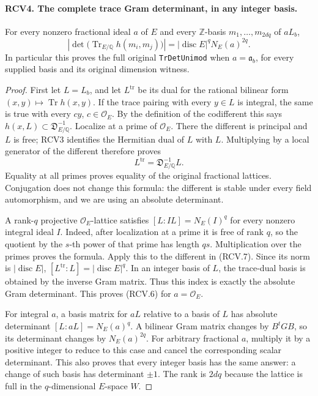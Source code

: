 \paragraph{RCV4. The complete trace Gram determinant, in any integer basis.}
\label{claim:RCV4}
For every nonzero fractional ideal \(a\) of \(E\) and every
\(\mathbb Z\)-basis \(m_1,\ldots,m_{2dq}\) of \(aL_b\),
\[
 \left|\det\big(\operatorname{Tr}_{E/\mathbb Q}
                         h(m_i,m_j)\big)\right|
       =|\operatorname{disc}E|^q N_E(a)^{2q}.
\tag{RCV.6}
\]
In particular this proves the full original \texttt{TrDetUnimod}
when \(a=\mathfrak a_b\), for every supplied basis and its original
dimension witness.
\begin{proof}
First let \(L=L_b\), and let \(L^{\mathrm{tr}}\) be its dual for
the rational bilinear form \((x,y)\mapsto\operatorname{Tr}h(x,y)\).
If the trace pairing with every \(y\in L\) is integral, the same
is true with every \(cy\), \(c\in\mathcal O_E\).  By the
definition of the codifferent this says
\(h(x,L)\subset\mathfrak D_{E/\mathbb Q}^{-1}\).  Localize
at a prime of \(\mathcal O_E\).  There the different is principal
and \(L\) is free; RCV3 identifies the Hermitian dual of \(L\)
with \(L\).  Multiplying by a local generator of the different
therefore proves
\[
           L^{\mathrm{tr}}=\mathfrak D_{E/\mathbb Q}^{-1}L.
\tag{RCV.7}
\]
Equality at all primes proves equality of the original fractional
lattices.  Conjugation does not change this formula: the different
is stable under every field automorphism, and we are using an
absolute determinant.

A rank-\(q\) projective \(\mathcal O_E\)-lattice satisfies
\([L:IL]=N_E(I)^q\) for every nonzero integral ideal \(I\).
Indeed, after localization at a prime it is free of rank \(q\),
so the quotient by the \(s\)-th power of that prime has length
\(qs\).  Multiplication over the primes proves the formula.
Apply this to the different in (RCV.7).  Since its norm is
\(|\operatorname{disc}E|\),
\([L^{\mathrm{tr}}:L]=|\operatorname{disc}E|^q\).
In an integer basis of \(L\), the trace-dual basis is obtained
by the inverse Gram matrix.  Thus this index is exactly the
absolute Gram determinant.  This proves (RCV.6) for \(a=\mathcal O_E\).

For integral \(a\), a basis matrix for \(aL\) relative to a
basis of \(L\) has absolute determinant \([L:aL]=N_E(a)^q\).
A bilinear Gram matrix changes by \(B^tGB\), so its determinant
changes by \(N_E(a)^{2q}\).  For arbitrary fractional \(a\),
multiply it by a positive integer to reduce to this case and
cancel the corresponding scalar determinant.  This also proves
that every integer basis has the same answer: a change of such
basis has determinant \(\pm1\).  The rank is \(2dq\) because
the lattice is full in the \(q\)-dimensional \(E\)-space \(W\).
\end{proof}

